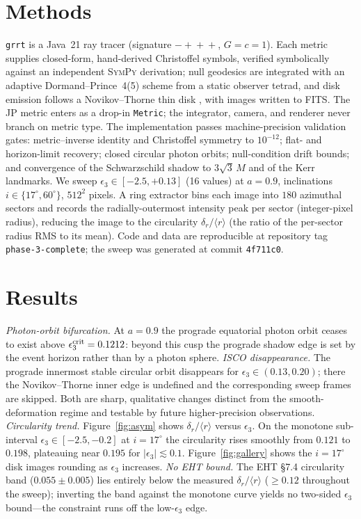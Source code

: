\documentclass[RNAAS]{aastex631}
\begin{document}
\section{Methods}
\texttt{grrt} is a Java~21 ray tracer (signature $-\!+\!+\!+$,
$G=c=1$). Each metric supplies closed-form, hand-derived Christoffel
symbols, verified symbolically against an independent \textsc{SymPy}
derivation; null geodesics are integrated with an adaptive
Dormand--Prince~4(5) scheme \citep{dormandprince:1980} from a static
observer tetrad, and disk emission follows a Novikov--Thorne thin disk
\citep{novikovthorne:1973,pagethorne:1974}, with images written to FITS.
The JP metric \citep{johannsen:2011} enters as a drop-in \texttt{Metric};
the integrator, camera, and renderer never branch on metric type. The
implementation passes machine-precision validation gates: metric--inverse
identity and Christoffel symmetry to $10^{-12}$; flat- and horizon-limit
recovery; closed circular photon orbits; null-condition drift bounds; and
convergence of the Schwarzschild shadow to $3\sqrt{3}\,M$ and of the Kerr
landmarks. We sweep $\epsilon_3\in[-2.5,+0.13]$ (16 values) at $a=0.9$,
inclinations $i\in\{17^\circ,60^\circ\}$, $512^2$ pixels. A ring extractor
bins each image into $180$ azimuthal sectors and records the
radially-outermost intensity peak per sector (integer-pixel radius),
reducing the image to the circularity $\delta_r/\langle r\rangle$ (the
ratio of the per-sector radius RMS to its mean). Code and data are
reproducible at repository tag \texttt{phase-3-complete}; the sweep was
generated at commit \texttt{4f711c0}.

\section{Results}
\emph{Photon-orbit bifurcation.} At $a=0.9$ the prograde equatorial
photon orbit ceases to exist above $\epsilon_3^{\rm crit}=0.1212$: beyond
this cusp the prograde shadow edge is set by the event horizon rather
than by a photon sphere. \emph{ISCO disappearance.} The prograde
innermost stable circular orbit disappears for $\epsilon_3\in(0.13,0.20)$;
there the Novikov--Thorne inner edge is undefined and the corresponding
sweep frames are skipped. Both are sharp, qualitative changes distinct
from the smooth-deformation regime and testable by future higher-precision
observations. \emph{Circularity trend.} Figure~\ref{fig:asym} shows
$\delta_r/\langle r\rangle$ versus $\epsilon_3$. On the monotone
sub-interval $\epsilon_3\in[-2.5,-0.2]$ at $i=17^\circ$ the circularity
rises smoothly from $0.121$ to $0.198$, plateauing near $0.195$ for
$|\epsilon_3|\lesssim0.1$. Figure~\ref{fig:gallery} shows the $i=17^\circ$
disk images rounding as $\epsilon_3$ increases. \emph{No EHT bound.} The
EHT \S7.4 circularity band ($0.055\pm0.005$) lies entirely below the
measured $\delta_r/\langle r\rangle$ ($\geq0.12$ throughout the sweep);
inverting the band against the monotone curve yields no two-sided
$\epsilon_3$ bound---the constraint runs off the low-$\epsilon_3$ edge.
\end{document}
